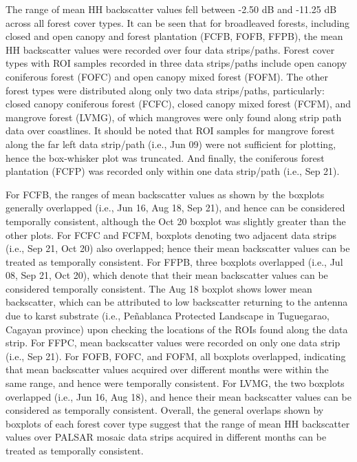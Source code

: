 The range of mean HH backscatter values fell between -2.50 dB and -11.25 dB across all forest cover types. It can be seen that for broadleaved forests, including closed and open canopy and forest plantation (FCFB, FOFB, FFPB), the mean HH backscatter values were recorded over four data strips/paths. Forest cover types with ROI samples recorded in three data strips/paths include open canopy coniferous forest (FOFC) and open canopy mixed forest (FOFM). The other forest types were distributed along only two data strips/paths, particularly: closed canopy coniferous forest (FCFC), closed canopy mixed forest (FCFM), and mangrove forest (LVMG), of which mangroves were only found along strip path data over coastlines. It should be noted that ROI samples for mangrove forest along the far left data strip/path (i.e., Jun 09) were not sufficient for plotting, hence the box-whisker plot was truncated. And finally, the coniferous forest plantation (FCFP) was recorded only within one data strip/path (i.e., Sep 21).

For FCFB, the ranges of mean backscatter values as shown by the boxplots generally overlapped (i.e., Jun 16, Aug 18, Sep 21), and hence can be considered temporally consistent, although the Oct 20 boxplot was slightly greater than the other plots. For FCFC and FCFM, boxplots denoting two adjacent data strips (i.e., Sep 21, Oct 20) also overlapped; hence their mean backscatter values can be treated as temporally consistent. For FFPB, three boxplots overlapped (i.e., Jul 08, Sep 21, Oct 20), which denote that their mean backscatter values can be considered temporally consistent. The Aug 18 boxplot shows lower mean backscatter, which can be attributed to low backscatter returning to the antenna due to karst substrate (i.e., Peñablanca Protected Landscape in Tuguegarao, Cagayan province) upon checking the locations of the ROIs found along the data strip. For FFPC, mean backscatter values were recorded on only one data strip (i.e., Sep 21). For FOFB, FOFC, and FOFM, all boxplots overlapped, indicating that mean backscatter values acquired over different months were within the same range, and hence were temporally consistent. For LVMG, the two boxplots overlapped (i.e., Jun 16, Aug 18), and hence their mean backscatter values can be considered as temporally consistent. Overall, the general overlaps shown by boxplots of each forest cover type suggest that the range of mean HH backscatter values over PALSAR mosaic data strips acquired in different months can be treated as temporally consistent.

